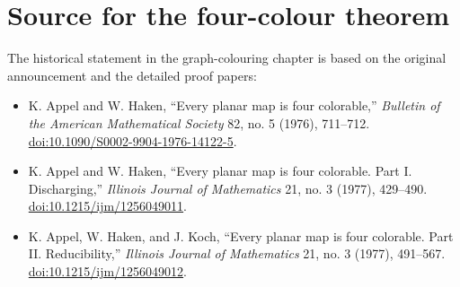 \section*{Source for the four-colour theorem}
The historical statement in the graph-colouring chapter is based on the original announcement and the detailed proof papers:
\begin{itemize}
\item K. Appel and W. Haken, ``Every planar map is four colorable,'' \emph{Bulletin of the American Mathematical Society} 82, no. 5 (1976), 711--712. \href{https://doi.org/10.1090/S0002-9904-1976-14122-5}{doi:10.1090/S0002-9904-1976-14122-5}.
\item K. Appel and W. Haken, ``Every planar map is four colorable. Part I. Discharging,'' \emph{Illinois Journal of Mathematics} 21, no. 3 (1977), 429--490. \href{https://doi.org/10.1215/ijm/1256049011}{doi:10.1215/ijm/1256049011}.
\item K. Appel, W. Haken, and J. Koch, ``Every planar map is four colorable. Part II. Reducibility,'' \emph{Illinois Journal of Mathematics} 21, no. 3 (1977), 491--567. \href{https://doi.org/10.1215/ijm/1256049012}{doi:10.1215/ijm/1256049012}.
\end{itemize}
